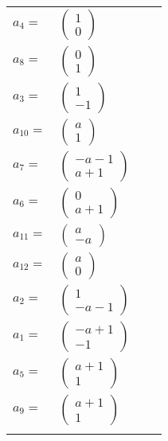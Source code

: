 \documentclass[1p]{elsarticle_modified}
\theoremstyle{definition}
\begin{document}
\begin{tabular}{m{7pt} m{180pt} m{7pt} m{180pt} }
\flushright $a_{4}=$&$\begin{pmatrix}1\\0\end{pmatrix}$ \\
\flushright $a_{8}=$&$\begin{pmatrix}0\\1\end{pmatrix}$ \\
\flushright $a_{3}=$&$\begin{pmatrix}1\\-1\end{pmatrix}$ \\
\flushright $a_{10}=$&$\begin{pmatrix}a\\1\end{pmatrix}$ \\
\flushright $a_{7}=$&$\begin{pmatrix}- a-1\\a+1\end{pmatrix}$ \\
\flushright $a_{6}=$&$\begin{pmatrix}0\\a+1\end{pmatrix}$ \\
\flushright $a_{11}=$&$\begin{pmatrix}a\\- a\end{pmatrix}$ \\
\flushright $a_{12}=$&$\begin{pmatrix}a\\0\end{pmatrix}$ \\
\flushright $a_{2}=$&$\begin{pmatrix}1\\- a-1\end{pmatrix}$ \\
\flushright $a_{1}=$&$\begin{pmatrix}- a+1\\-1\end{pmatrix}$ \\
\flushright $a_{5}=$&$\begin{pmatrix}a+1\\1\end{pmatrix}$ \\
\flushright $a_{9}=$&$\begin{pmatrix}a+1\\1\end{pmatrix}$\\&\end{tabular}
\end{document}
